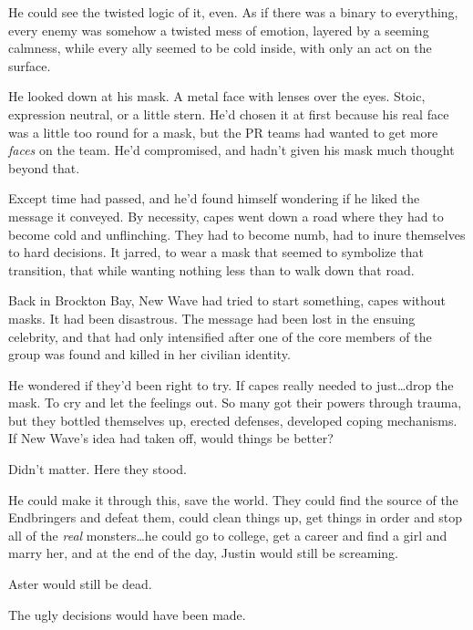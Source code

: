 He could see the twisted logic of it, even.  As if there was a binary to everything, every enemy was somehow a twisted mess of emotion, layered by a seeming calmness, while every ally seemed to be cold inside, with only an act on the surface.



He looked down at his mask.  A metal face with lenses over the eyes.  Stoic, expression neutral, or a little stern.  He'd chosen it at first because his real face was a little too round for a mask, but the PR teams had wanted to get more \emph{faces} on the team.  He'd compromised, and hadn't given his mask much thought beyond that.



Except time had passed, and he'd found himself wondering if he liked the message it conveyed.  By necessity, capes went down a road where they had to become cold and unflinching.  They had to become numb, had to inure themselves to hard decisions.  It jarred, to wear a mask that seemed to symbolize that transition, that while wanting nothing less than to walk down that road.



Back in Brockton Bay, New Wave had tried to start something, capes without masks.  It had been disastrous.  The message had been lost in the ensuing celebrity, and that had only intensified after one of the core members of the group was found and killed in her civilian identity.



He wondered if they'd been right to try.  If capes really needed to just\ldots drop the mask.  To cry and let the feelings out.  So many got their powers through trauma, but they bottled themselves up, erected defenses, developed coping mechanisms.  If New Wave's idea had taken off, would things be better?



Didn't matter.  Here they stood.



He could make it through this, save the world.  They could find the source of the Endbringers and defeat them, could clean things up, get things in order and stop all of the \emph{real} monsters\ldots he could go to college, get a career and find a girl and marry her, and at the end of the day, Justin would still be screaming.



Aster would still be dead.



The ugly decisions would have been made.




